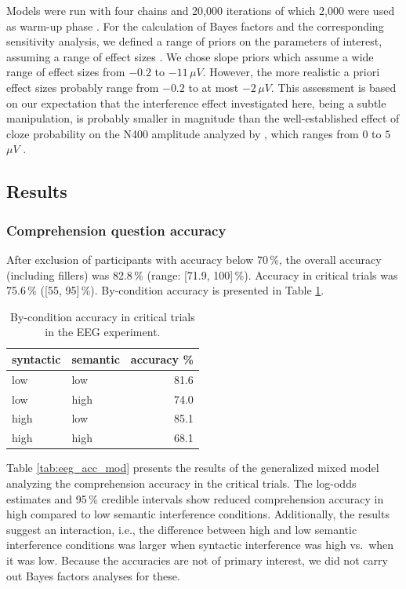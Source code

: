 \documentclass[a4paper, man, floatsintext]{apa7}
\begin{document}
Models were run with four chains and 20,000 iterations of which 2,000 were used as warm-up phase \citep{schad_etal_2022_BF}. For the calculation of Bayes factors and the corresponding sensitivity analysis, we defined a range of priors on the parameters of interest, assuming a range of effect sizes \citep{nicenboim_stats}. We chose slope priors which assume a wide range of effect sizes from $-0.2$ to $-11$\,$\mu V$. However, the more realistic a priori effect sizes probably range from $-0.2$ to at most $-2$\,$\mu V$. This assessment is based on our expectation that the interference effect investigated here, being a subtle manipulation, is probably smaller in magnitude than the well-established  effect of cloze probability on the N400 amplitude analyzed by \textcite{nicenboim_stats}, which ranges from $0$ to $5$\,$\mu V$ \parencite[see section 5.2.5][]{nicenboim_stats}.

\subsection{Results}
\subsubsection{Comprehension question accuracy}
After exclusion of participants with accuracy below 70\,\%, the overall accuracy (including fillers) was 82.8\,\% (range: [71.9, 100]\,\%). Accuracy in critical trials was 75.6\,\% ([55, 95]\,\%). By-condition accuracy is presented in Table \ref{tab:eeg_acc}. 

\begin{table}[]
    \caption{By-condition accuracy in critical trials in the EEG experiment.}
    \label{tab:eeg_acc}
    \centering
    \begin{tabular}{llr}
    \toprule
    syntactic & semantic & accuracy \%\\
    \midrule
        low &  low & 81.6\\
        low &  high & 74.0\\
        high &  low & 85.1\\
        high &  high & 68.1\\
    \bottomrule
    \end{tabular}
\end{table}

Table \ref{tab:eeg_acc_mod} presents the results of the generalized mixed model analyzing the comprehension accuracy in the critical trials. The log-odds estimates and 95\,\% credible intervals show reduced comprehension accuracy in high compared to low semantic interference conditions. Additionally, the results suggest an interaction, i.e., the difference between high and low semantic interference conditions was larger when syntactic interference was high vs.\ when it was low. Because the accuracies are not of primary interest, we did not carry out Bayes factors analyses for these.
\end{document}
